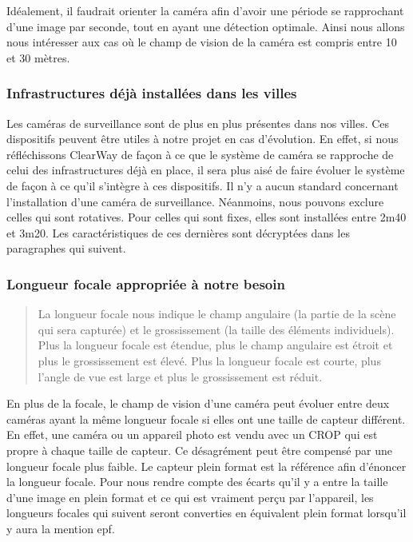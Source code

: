 Idéalement, il faudrait orienter la caméra afin d'avoir une période se rapprochant d'une image par seconde, tout en ayant une détection optimale.
Ainsi nous allons nous intéresser aux cas où le champ de vision de la caméra est compris entre 10 et 30 mètres.

\subsubsection{Infrastructures déjà installées dans les villes}
\label{sec:camera_infra}
Les caméras de surveillance sont de plus en plus présentes dans nos villes. Ces dispositifs peuvent être utiles à notre projet en cas d'évolution.
En effet, si nous réfléchissons ClearWay de façon à ce que le système de caméra se rapproche de celui des infrastructures déjà en place,
il sera plus aisé de faire évoluer le système de façon à ce qu'il s'intègre à ces dispositifs.
Il n'y a aucun standard concernant l'installation d'une caméra de surveillance. Néanmoins, nous pouvons exclure celles qui sont rotatives.
Pour celles qui sont fixes, elles sont installées entre 2m40 et 3m20. Les caractéristiques de ces dernières sont décryptées dans les paragraphes qui suivent.

\subsubsection{Longueur focale appropriée à notre besoin}
\label{sec:camera_focale}

\blockquote{La longueur focale nous indique le champ angulaire (la partie de la scène qui sera capturée)
    et le grossissement (la taille des éléments individuels).
    Plus la longueur focale est étendue, plus le champ angulaire est étroit et plus le grossissement est élevé.
    Plus la longueur focale est courte, plus l’angle de vue est large et plus le grossissement est réduit.}{\cite{focale}}

En plus de la focale, le champ de vision d'une caméra peut évoluer entre deux caméras ayant la même longueur focale
si elles ont une taille de capteur différent.
En effet, une caméra ou un appareil photo est vendu avec un \gls{CROP} qui est propre à chaque taille de capteur.
Ce désagrément peut être compensé par une longueur focale plus faible.
Le capteur plein format est la référence afin d'énoncer la longueur focale.
Pour nous rendre compte des écarts qu'il y a entre la taille d'une image en plein format et ce qui est vraiment perçu par l'appareil,
les longueurs focales qui suivent seront converties en équivalent plein format lorsqu'il y aura la mention \gls{epf}.

